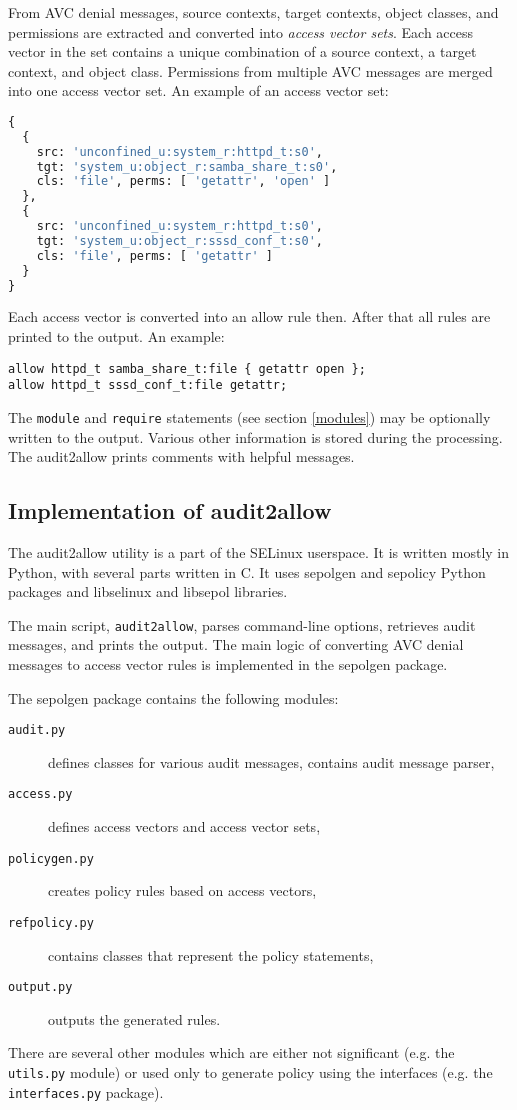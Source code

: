 From AVC denial messages, source contexts, target contexts, object classes, and
permissions are extracted and converted into \emph{access vector sets}. Each
access vector in the set contains a unique combination of a source context, a
target context, and object class. Permissions from multiple AVC messages are
merged into one access vector set. An example of an access vector set:
\begin{lstlisting}[language=Python]
{
  {
    src: 'unconfined_u:system_r:httpd_t:s0',
    tgt: 'system_u:object_r:samba_share_t:s0',
    cls: 'file', perms: [ 'getattr', 'open' ]
  },
  {
    src: 'unconfined_u:system_r:httpd_t:s0',
    tgt: 'system_u:object_r:sssd_conf_t:s0',
    cls: 'file', perms: [ 'getattr' ]
  }
}
\end{lstlisting}

Each access vector is converted into an allow rule then. After that all rules
are printed to the output. An example:
\begin{lstlisting}
allow httpd_t samba_share_t:file { getattr open };
allow httpd_t sssd_conf_t:file getattr;
\end{lstlisting}
The \texttt{module} and \texttt{require} statements (see section \ref{modules})
may be optionally written to the output. Various other information is stored
during the processing. The audit2allow prints comments with helpful messages.

\subsection{Implementation of audit2allow}
\label{implementation}
The audit2allow utility is a part of the SELinux userspace. It is written mostly
in Python, with several parts written in C. It uses sepolgen and sepolicy Python
packages and libselinux and libsepol libraries.

The main script, \texttt{audit2allow}, parses command-line options, retrieves
audit messages, and prints the output. The main logic of converting AVC denial
messages to access vector rules is implemented in the sepolgen package.

The sepolgen package contains the following modules:
\begin{description}
    \item [\texttt{audit.py}] defines classes for various audit messages,
        contains audit message parser,
    \item [\texttt{access.py}] defines access vectors and access vector sets,
    \item [\texttt{policygen.py}] creates policy rules based on access vectors,
    \item [\texttt{refpolicy.py}] contains classes that represent the policy
        statements,
    \item [\texttt{output.py}] outputs the generated rules.
\end{description}
There are several other modules which are either not significant (e.g. the
\texttt{utils.py} module) or used only to generate policy using the interfaces
(e.g. the \texttt{interfaces.py} package).

